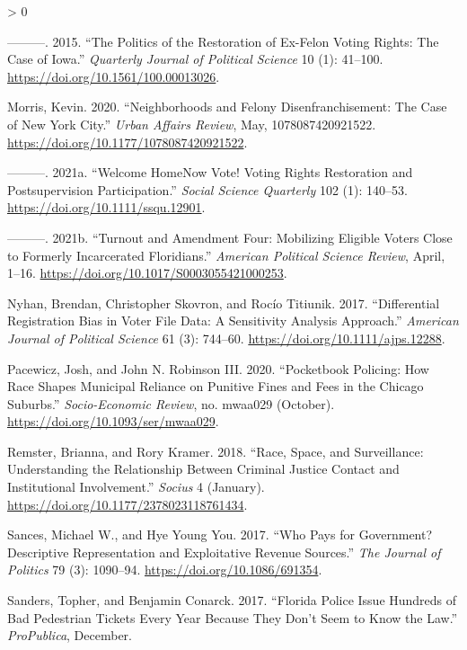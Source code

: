 \documentclass[
  12pt,
]{article}
\newlength{\cslhangindent}
\newenvironment{CSLReferences}[2] %
 {%
  \setlength{\parindent}{0pt}
  \ifodd #1 \everypar{\setlength{\hangindent}{\cslhangindent}}\ignorespaces\fi
  \ifnum #2 > 0
  \setlength{\parskip}{#2\baselineskip}
  \fi
 }%
 {}
\begin{document}
\begin{CSLReferences}{1}{0}
\leavevmode\hypertarget{ref-Meredith2015}{}%
---------. 2015. {``The {Politics} of the {Restoration} of {Ex-Felon Voting Rights}: {The Case} of {Iowa}.''} \emph{Quarterly Journal of Political Science} 10 (1): 41--100. \url{https://doi.org/10.1561/100.00013026}.

\leavevmode\hypertarget{ref-Morris2020}{}%
Morris, Kevin. 2020. {``Neighborhoods and {Felony Disenfranchisement}: {The Case} of {New York City}.''} \emph{Urban Affairs Review}, May, 1078087420921522. \url{https://doi.org/10.1177/1078087420921522}.

\leavevmode\hypertarget{ref-Morris2021a}{}%
---------. 2021a. {``Welcome {Home}{{Now Vote}}! {Voting Rights Restoration} and {Postsupervision Participation}.''} \emph{Social Science Quarterly} 102 (1): 140--53. \url{https://doi.org/10.1111/ssqu.12901}.

\leavevmode\hypertarget{ref-Morris2021}{}%
---------. 2021b. {``Turnout and {Amendment Four}: {Mobilizing Eligible Voters Close} to {Formerly Incarcerated Floridians}.''} \emph{American Political Science Review}, April, 1--16. \url{https://doi.org/10.1017/S0003055421000253}.

\leavevmode\hypertarget{ref-Nyhan2017}{}%
Nyhan, Brendan, Christopher Skovron, and Rocío Titiunik. 2017. {``Differential {Registration Bias} in {Voter File Data}: {A Sensitivity Analysis Approach}.''} \emph{American Journal of Political Science} 61 (3): 744--60. \url{https://doi.org/10.1111/ajps.12288}.

\leavevmode\hypertarget{ref-Pacewicz2020}{}%
Pacewicz, Josh, and John N. Robinson III. 2020. {``Pocketbook Policing: {How} Race Shapes Municipal Reliance on Punitive Fines and Fees in the {Chicago} Suburbs.''} \emph{Socio-Economic Review}, no. mwaa029 (October). \url{https://doi.org/10.1093/ser/mwaa029}.

\leavevmode\hypertarget{ref-Remster2018a}{}%
Remster, Brianna, and Rory Kramer. 2018. {``Race, {Space}, and {Surveillance}: {Understanding} the {Relationship} Between {Criminal Justice Contact} and {Institutional Involvement}.''} \emph{Socius} 4 (January). \url{https://doi.org/10.1177/2378023118761434}.

\leavevmode\hypertarget{ref-Sances2017}{}%
Sances, Michael W., and Hye Young You. 2017. {``Who {Pays} for {Government}? {Descriptive Representation} and {Exploitative Revenue Sources}.''} \emph{The Journal of Politics} 79 (3): 1090--94. \url{https://doi.org/10.1086/691354}.

\leavevmode\hypertarget{ref-Sanders2017}{}%
Sanders, Topher, and Benjamin Conarck. 2017. {``Florida {Police Issue Hundreds} of {Bad Pedestrian Tickets Every Year Because They Don}'t {Seem} to {Know} the {Law}.''} \emph{ProPublica}, December.


\end{CSLReferences}
\end{document}
